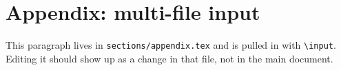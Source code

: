 \section{Appendix: multi-file input}
This paragraph lives in \texttt{sections/appendix.tex} and is pulled in with
\texttt{\textbackslash input}. Editing it should show up as a change in that file,
not in the main document.
